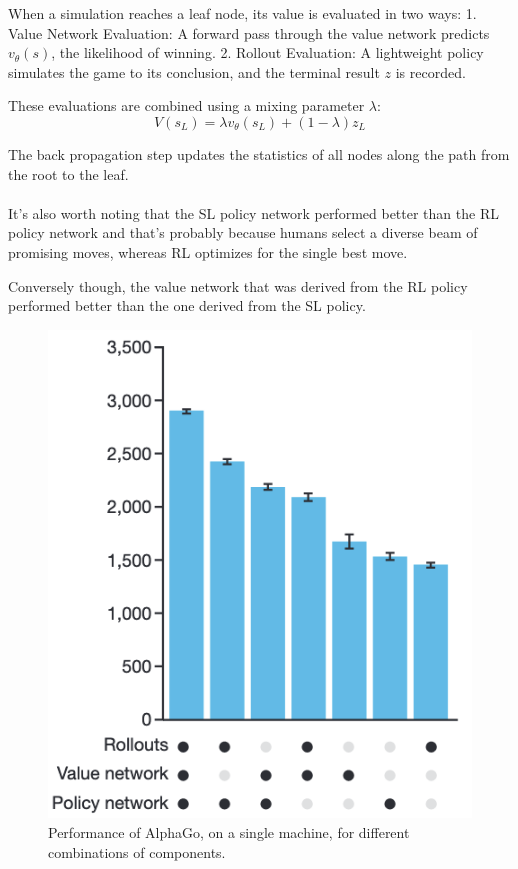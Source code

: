 When a simulation reaches a leaf node, its value is evaluated in two ways: 1.
Value Network Evaluation: A forward pass through the value network predicts \(
v_\theta(s) \), the likelihood of winning. 2. Rollout Evaluation: A lightweight
policy simulates the game to its conclusion, and the terminal result \( z \) is
recorded.

These evaluations are combined using a mixing parameter \( \lambda \):
\begin{equation}
    V(s_L) = \lambda v_\theta(s_L) + (1 - \lambda) z_L
\end{equation}

The back propagation step updates the statistics of all nodes along the path
from the root to the leaf. \\\\ It's also worth noting that the SL policy
network performed better than the RL policy network and that's probably because
humans select a diverse beam of promising moves, whereas RL optimizes for the
single best move.

Conversely though, the value network that was derived from the RL policy
performed better than the one derived from the SL policy.
\begin{figure}[htbp]
    \centering
    \includegraphics[width=\linewidth, height=0.2\textheight, keepaspectratio]{innovation.png}
    \caption{Performance of AlphaGo, on a single machine, for different
combinations of components.}
\end{figure}

